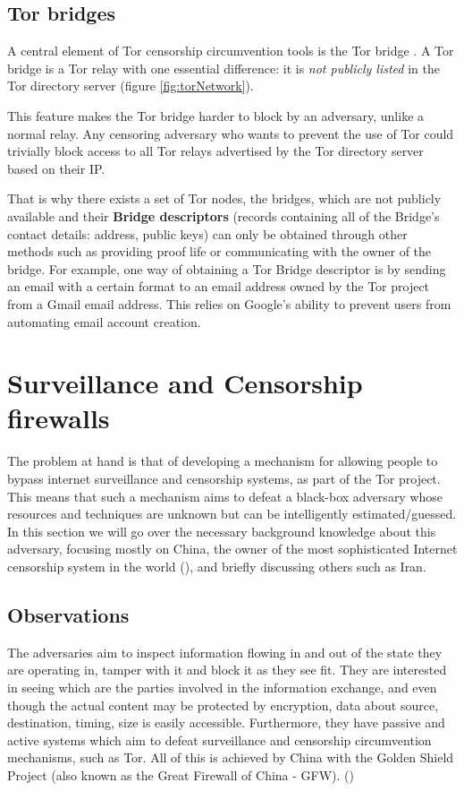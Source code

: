 \documentclass[11pt]{book} %
\begin{document}
\subsection{Tor bridges}

A central element of Tor censorship circumvention tools is the Tor bridge \citep*{web:torBridges}. A Tor bridge is a Tor relay with one essential difference: it is \textit{not publicly listed} in the Tor directory server (figure \ref{fig:torNetwork}). 

This feature makes the Tor bridge harder to block by an adversary, unlike a normal relay. Any censoring adversary who wants to prevent the use of Tor could trivially block access to all Tor relays advertised by the Tor directory server based on their IP.

That is why there exists a set of Tor nodes, the bridges, which are not publicly available and their \textbf{Bridge descriptors} (records containing all of the Bridge's contact details: address, public keys) can only be obtained through other methods such as providing proof life or communicating with the owner of the bridge. For example, one way of obtaining a Tor Bridge descriptor is by sending an email with a certain format to an email address owned by the Tor project from a Gmail email address. This relies on Google's ability to prevent users from automating email account creation.


\section{Surveillance and Censorship firewalls}

The problem at hand is that of developing a mechanism for allowing people to bypass internet surveillance and censorship systems, as part of  the Tor project. This means that such a mechanism aims to defeat a black-box adversary whose resources and techniques are unknown but can be intelligently estimated/guessed. In this section we will go over the necessary background knowledge about this adversary, focusing mostly on China, the owner of the most sophisticated Internet censorship system in the world (\citep*{web:openNet}), and briefly discussing others such as Iran.

\subsection{Observations}

The adversaries aim to inspect information flowing in and out of the state they are operating in, tamper with it and block it as they see fit. They are interested in seeing which are the parties involved in the information exchange, and even though the actual content may be protected by encryption, data about source, destination, timing, size is easily accessible. Furthermore, they have passive and active systems which aim to defeat surveillance and censorship circumvention mechanisms, such as Tor. All of this is achieved by China with the Golden Shield Project (also known as the Great Firewall of China - GFW). (\citep*{web:hikingGFW})
\end{document}
